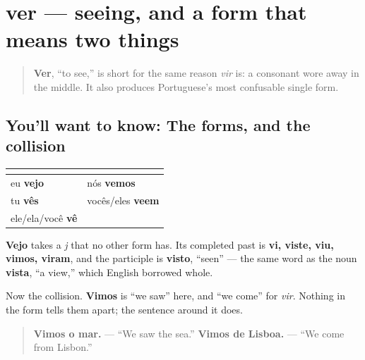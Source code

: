 \section[ver]{ver — seeing, and a form that means two things}

\label{lesson:PT-C18-ver}



\begin{quote}
\textbf{Ver}, \textquotedblleft{}to see,\textquotedblright{} is short for the same reason \emph{vir} is: a consonant wore away in the middle. It also produces Portuguese's most confusable single form.
\end{quote}

\subsection*{You'll want to know: The forms, and the collision}
\noindent
\begin{tabularx}{\linewidth}{@{}>{\raggedright\arraybackslash}X>{\raggedright\arraybackslash}X@{}}
\toprule
\textbf{} & \textbf{} \\
\midrule
eu \textbf{vejo} & nós \textbf{vemos} \\
tu \textbf{vês} & vocês/eles \textbf{veem} \\
ele/ela/você \textbf{vê} &  \\
\bottomrule
\end{tabularx}

\textbf{Vejo} takes a \emph{j} that no other form has. Its completed past is \textbf{vi, viste, viu, vimos, viram}, and the participle is \textbf{visto}, \textquotedblleft{}seen\textquotedblright{} — the same word as the noun \textbf{vista}, \textquotedblleft{}a view,\textquotedblright{} which English borrowed whole.

Now the collision. \textbf{Vimos} is \textquotedblleft{}we saw\textquotedblright{} here, and \textquotedblleft{}we come\textquotedblright{} for \emph{vir}. Nothing in the form tells them apart; the sentence around it does.

\begin{quote}
\textbf{Vimos o mar.} — \textquotedblleft{}We saw the sea.\textquotedblright{} \textbf{Vimos de Lisboa.} — \textquotedblleft{}We come from Lisbon.\textquotedblright{}
\end{quote}

